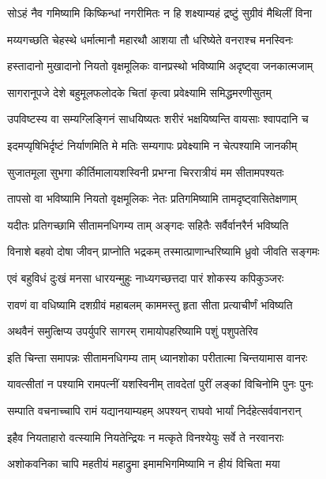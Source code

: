 \twolineshloka
{सोऽहं नैव गमिष्यामि किष्किन्धां नगरीमितः}
{न हि शक्ष्याम्यहं द्रष्टुं सुग्रीवं मैथिलीं विना} %

\twolineshloka
{मय्यगच्छति चेहस्थे धर्मात्मानौ महारथौ}
{आशया तौ धरिष्येते वनराश्च मनस्विनः} %

\twolineshloka
{हस्तादानो मुखादानो नियतो वृक्षमूलिकः}
{वानप्रस्थो भविष्यामि अदृष्ट्वा जनकात्मजाम्} %

\twolineshloka
{सागरानूपजे देशे बहुमूलफलोदके}
{चितां कृत्वा प्रवेक्ष्यामि समिद्धमरणीसुतम्} %

\twolineshloka
{उपविष्टस्य वा सम्यग्लिङ्गिनं साधयिष्यतः}
{शरीरं भक्षयिष्यन्ति वायसाः श्वापदानि च} %

\twolineshloka
{इदमप्यृषिभिर्दृष्टं निर्याणमिति मे मतिः}
{सम्यगापः प्रवेक्ष्यामि न चेत्पश्यामि जानकीम्} %

\twolineshloka
{सुजातमूला सुभगा कीर्तिमालायशस्विनी}
{प्रभग्ना चिररात्रीयं मम सीतामपश्यतः} %

\twolineshloka
{तापसो वा भविष्यामि नियतो वृक्षमूलिकः}
{नेतः प्रतिगमिष्यामि तामदृष्ट्वासितेक्षणाम्} %

\twolineshloka
{यदीतः प्रतिगच्छामि सीतामनधिगम्य ताम्}
{अङ्गदः सहितैः सर्वैर्वानरैर्न भविष्यति} %

\twolineshloka
{विनाशे बहवो दोषा जीवन् प्राप्नोति भद्रकम्}
{तस्मात्प्राणान्धरिष्यामि ध्रुवो जीवति सङ्गमः} %

\twolineshloka
{एवं बहुविधं दुःखं मनसा धारयन्मुहुः}
{नाध्यगच्छत्तदा पारं शोकस्य कपिकुञ्जरः} %

\twolineshloka
{रावणं वा वधिष्यामि दशग्रीवं महाबलम्}
{काममस्तु हृता सीता प्रत्याचीर्णं भविष्यति} %

\twolineshloka
{अथवैनं समुत्क्षिप्य उपर्युपरि सागरम्}
{रामायोपहरिष्यामि पशुं पशुपतेरिव} %

\twolineshloka
{इति चिन्ता समापन्नः सीतामनधिगम्य ताम्}
{ध्यानशोका परीतात्मा चिन्तयामास वानरः} %

\twolineshloka
{यावत्सीतां न पश्यामि रामपत्नीं यशस्विनीम्}
{तावदेतां पुरीं लङ्कां विचिनोमि पुनः पुनः} %

\twolineshloka
{सम्पाति वचनाच्चापि रामं यद्यानयाम्यहम्}
{अपश्यन् राघवो भार्यां निर्दहेत्सर्ववानरान्} %

\twolineshloka
{इहैव नियताहारो वत्स्यामि नियतेन्द्रियः}
{न मत्कृते विनश्येयुः सर्वे ते नरवानराः} %

\twolineshloka
{अशोकवनिका चापि महतीयं महाद्रुमा}
{इमामभिगमिष्यामि न हीयं विचिता मया} %

